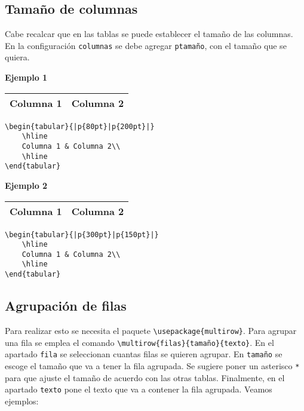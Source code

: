 \subsection{Tamaño de columnas}	

Cabe recalcar que en las tablas se puede establecer el tamaño de las columnas. En la configuración \texttt{columnas} se debe agregar \texttt{p{tamaño}}, con el tamaño que se quiera.

\textbf{Ejemplo 1}

\begin{center}
	\begin{tabular}{|p{80pt}|p{200pt}|}
		\hline
		Columna 1 & Columna 2\\
		\hline
	\end{tabular}
\end{center}	

\begin{myquote}
	\begin{lstlisting}
\begin{tabular}{|p{80pt}|p{200pt}|}
	\hline
	Columna 1 & Columna 2\\
	\hline
\end{tabular}		
	\end{lstlisting}
\end{myquote}

\textbf{Ejemplo 2}

\begin{center}
	\begin{tabular}{|p{300pt}|p{150pt}|}
		\hline
		Columna 1 & Columna 2\\
		\hline
	\end{tabular}
\end{center}	

\begin{myquote}
	\begin{lstlisting}
\begin{tabular}{|p{300pt}|p{150pt}|}
	\hline
	Columna 1 & Columna 2\\
	\hline
\end{tabular}		
	\end{lstlisting}
\end{myquote}

\subsection{Agrupación de filas}

Para realizar esto se necesita el paquete \verb|\usepackage{multirow}|. Para agrupar una fila se emplea el comando \verb|\multirow{filas}{tamaño}{texto}|. En el apartado \verb|fila| se seleccionan cuantas filas se quieren agrupar. En \verb|tamaño| se escoge el tamaño que va a tener la fila agrupada. Se sugiere poner un asterisco \verb|*| para que ajuste el tamaño de acuerdo con las otras tablas. Finalmente, en el apartado \verb|texto| pone el texto que va a contener la fila agrupada. Veamos ejemplos:

